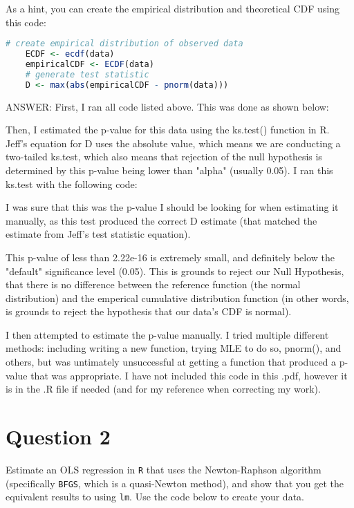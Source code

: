 \documentclass[12pt,letterpaper]{article}
\begin{document}
	
\noindent As a hint, you can create the empirical distribution and theoretical CDF using this code:

\begin{lstlisting}[language=R]
	# create empirical distribution of observed data
	ECDF <- ecdf(data)
	empiricalCDF <- ECDF(data)
	# generate test statistic
	D <- max(abs(empiricalCDF - pnorm(data))) \end{lstlisting}

\vspace{1cm}

ANSWER:
First, I ran all code listed above. This was done as shown below:
 

Then, I estimated the p-value for this data using the ks.test() function in R. Jeff's equation for D uses the absolute value, which means we are conducting a two-tailed ks.test, which also means that rejection of the null hypothesis is determined by this p-value being lower than "alpha" (usually 0.05). I ran this ks.test with the following code:
	
 	

I was sure that this was the p-value I should be looking for when estimating it manually, as this test produced the correct D estimate (that matched the estimate from Jeff's test statistic equation).

This p-value of less than 2.22e-16 is extremely small, and definitely below the "default" significance level (0.05). This is grounds to reject our Null Hypothesis, that there is no difference between the reference function (the normal distribution) and the emperical cumulative distribution function (in other words, is grounds to reject the hypothesis that our data's CDF is normal).


I then attempted to estimate the p-value manually. I tried multiple different methods: including writing a new function, trying MLE to do so, pnorm(), and others, but was untimately unsuccessful at getting a function that produced a p-value that was appropriate. I have not included this code in this .pdf, however it is in the .R file if needed (and for my reference when correcting my work).
	




\section*{Question 2}
\noindent Estimate an OLS regression in \texttt{R} that uses the Newton-Raphson algorithm (specifically \texttt{BFGS}, which is a quasi-Newton method), and show that you get the equivalent results to using \texttt{lm}. Use the code below to create your data.
\vspace{.5cm}
\end{document}
